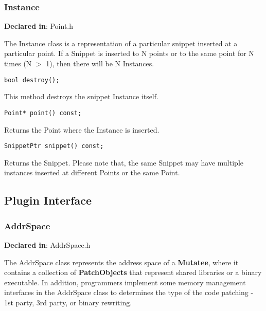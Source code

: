\subsubsection{Instance}
\label{sec-3.1.3}

\textbf{Declared in}: Point.h

The Instance class is a representation of a particular snippet inserted at a
particular point. If a Snippet is inserted to N points or to the same point for
N times (N $>$ 1), then there will be N Instances.


\begin{verbatim}
bool destroy();

\end{verbatim}



This method destroys the snippet Instance itself.


\begin{verbatim}
Point* point() const;

\end{verbatim}



Returns the Point where the Instance is inserted.


\begin{verbatim}
SnippetPtr snippet() const;

\end{verbatim}



Returns the Snippet. Please note that, the same Snippet may have multiple
instances inserted at different Points or the same Point.

\subsection{Plugin Interface}
\label{sec-3.2}

\subsubsection{AddrSpace}
\label{sec-3.2.1}

\textbf{Declared in}: AddrSpace.h

The AddrSpace class represents the address space of a \textbf{Mutatee}, where it
contains a collection of \textbf{PatchObjects} that represent shared libraries or a
binary executable. In addition, programmers implement some memory management
interfaces in the AddrSpace class to determines the type of the code patching -
1st party, 3rd party, or binary rewriting.


